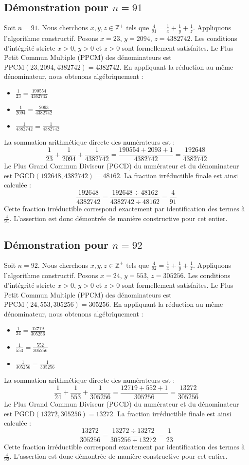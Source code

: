 \documentclass[11pt,a4paper]{article}
\begin{document}
\subsection{Démonstration pour $n = 91$}
Soit $n = 91$. Nous cherchons $x, y, z \in \mathbb{Z}^{+}$ tels que $\frac{4}{91} = \frac{1}{x} + \frac{1}{y} + \frac{1}{z}$.
Appliquons l'algorithme constructif. Posons $x = 23$, $y = 2094$, $z = 4382742$.
Les conditions d'intégrité stricte $x > 0$, $y > 0$ et $z > 0$ sont formellement satisfaites.
Le Plus Petit Commun Multiple (PPCM) des dénominateurs est $\text{PPCM}(23, 2094, 4382742) = 4382742$.
En appliquant la réduction au même dénominateur, nous obtenons algébriquement :
\begin{itemize}
    \item $\frac{1}{23} = \frac{190554}{4382742}$
    \item $\frac{1}{2094} = \frac{2093}{4382742}$
    \item $\frac{1}{4382742} = \frac{1}{4382742}$
\end{itemize}
La sommation arithmétique directe des numérateurs est :
$$ \frac{1}{23} + \frac{1}{2094} + \frac{1}{4382742} = \frac{190554 + 2093 + 1}{4382742} = \frac{192648}{4382742} $$
Le Plus Grand Commun Diviseur (PGCD) du numérateur et du dénominateur est $\text{PGCD}(192648, 4382742) = 48162$.
La fraction irréductible finale est ainsi calculée :
$$ \frac{192648}{4382742} = \frac{192648 \div 48162}{4382742 \div 48162} = \frac{4}{91} $$
Cette fraction irréductible correspond exactement par identification des termes à $\frac{4}{91}$. L'assertion est donc démontrée de manière constructive pour cet entier.

\subsection{Démonstration pour $n = 92$}
Soit $n = 92$. Nous cherchons $x, y, z \in \mathbb{Z}^{+}$ tels que $\frac{4}{92} = \frac{1}{x} + \frac{1}{y} + \frac{1}{z}$.
Appliquons l'algorithme constructif. Posons $x = 24$, $y = 553$, $z = 305256$.
Les conditions d'intégrité stricte $x > 0$, $y > 0$ et $z > 0$ sont formellement satisfaites.
Le Plus Petit Commun Multiple (PPCM) des dénominateurs est $\text{PPCM}(24, 553, 305256) = 305256$.
En appliquant la réduction au même dénominateur, nous obtenons algébriquement :
\begin{itemize}
    \item $\frac{1}{24} = \frac{12719}{305256}$
    \item $\frac{1}{553} = \frac{552}{305256}$
    \item $\frac{1}{305256} = \frac{1}{305256}$
\end{itemize}
La sommation arithmétique directe des numérateurs est :
$$ \frac{1}{24} + \frac{1}{553} + \frac{1}{305256} = \frac{12719 + 552 + 1}{305256} = \frac{13272}{305256} $$
Le Plus Grand Commun Diviseur (PGCD) du numérateur et du dénominateur est $\text{PGCD}(13272, 305256) = 13272$.
La fraction irréductible finale est ainsi calculée :
$$ \frac{13272}{305256} = \frac{13272 \div 13272}{305256 \div 13272} = \frac{1}{23} $$
Cette fraction irréductible correspond exactement par identification des termes à $\frac{4}{92}$. L'assertion est donc démontrée de manière constructive pour cet entier.
\end{document}
